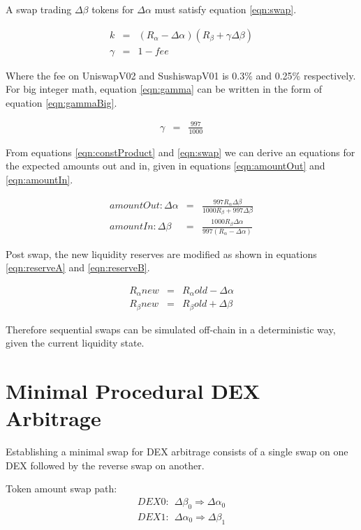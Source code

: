 \documentclass[runningheads]{llncs}
\begin{document}
A swap trading \( \Delta\beta\) tokens for \( \Delta\alpha \) must satisfy equation \ref{eqn:swap}.

\begin{eqnarray}
	k  &=& (R_{\alpha} - \Delta\alpha)  (R_{\beta} + \gamma\Delta\beta ) \label{eqn:swap}\\
	\gamma  &=& 1 - fee \label{eqn:gamma}
\end{eqnarray}

Where the fee on UniswapV02 and SushiswapV01 is 0.3\% and 0.25\% respectively. For big integer math, equation \ref{eqn:gamma} can be written in the form of equation \ref{eqn:gammaBig}.

\begin{eqnarray}
	\gamma  &=& \frac{997}{1000} \label{eqn:gammaBig}
\end{eqnarray}

From equations \ref{eqn:constProduct} and \ref{eqn:swap} we can derive an equations for the expected amounts out and in, given in equations \ref{eqn:amountOut} and \ref{eqn:amountIn}.

\begin{eqnarray}
	amountOut: \Delta\alpha  &=& \frac{997 R_{\alpha} \Delta\beta }{1000 R_{\beta} + 997 \Delta\beta} \label{eqn:amountOut}\\
	amountIn: \Delta\beta  &=& \frac{1000 R_{\beta} \Delta\alpha }{997 (R_{\alpha} - \Delta\alpha)} \label{eqn:amountIn}
\end{eqnarray}

Post swap, the new liquidity reserves are modified as shown in equations \ref{eqn:reserveA} and \ref{eqn:reserveB}.

\begin{eqnarray}
	R_{\alpha}{new}  &=& R_{\alpha}{old} - \Delta\alpha  \label{eqn:reserveA}\\
	R_{\beta}{new}  &=& R_{\beta}{old} + \Delta\beta  \label{eqn:reserveB}
\end{eqnarray}

Therefore sequential swaps can be simulated off-chain in a deterministic way, given the current liquidity state.

\section{Minimal Procedural DEX Arbitrage}
Establishing a minimal swap for DEX arbitrage consists of a single swap on one DEX followed by the reverse swap on another.

Token amount swap path:
\begin{eqnarray}
	DEX0: \: \: \Delta\beta_{0} \Rightarrow \Delta\alpha_{0}\\
	DEX1: \: \: \Delta\alpha_{0} \Rightarrow \Delta\beta_{1}
\end{eqnarray}
\end{document}
